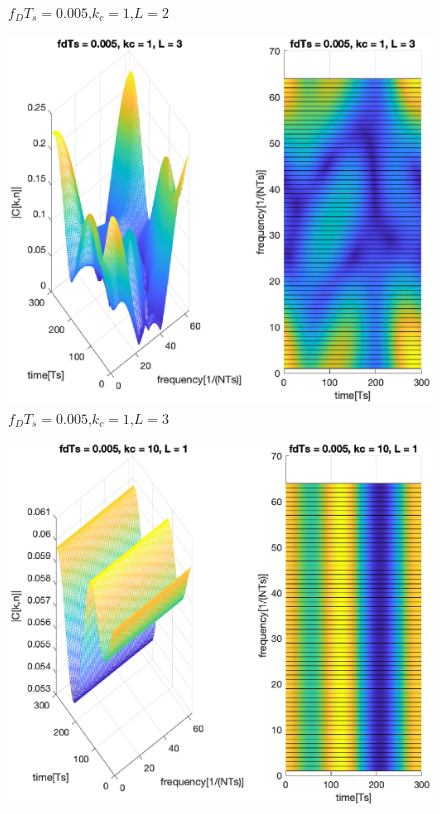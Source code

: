 \documentclass[conference]{IEEEtran}
\begin{document}
\begin{appendices}
\begin{figure}[H]
        \caption{$f_{D}T_{s}=0.005$,$k_{c}=1$,$L=2$}
        \label{0005_1_2}
    \end{figure}
    \begin{figure}[H]
        \centering
        \includegraphics[width=\linewidth]{Task2/0005_1_3.eps}
        \caption{$f_{D}T_{s}=0.005$,$k_{c}=1$,$L=3$}
        \label{0005_1_3}
    \end{figure}
    \begin{figure}[H]
        \centering
        \includegraphics[width=\linewidth]{Task2/0005_10_1.eps}

\end{figure}
\end{appendices}
\end{document}
